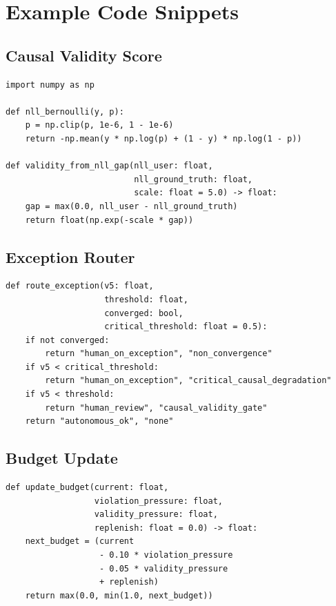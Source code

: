 \documentclass[11pt]{article}
\begin{document}
\section{Example Code Snippets}

\subsection{Causal Validity Score}

\begin{verbatim}
import numpy as np

def nll_bernoulli(y, p):
    p = np.clip(p, 1e-6, 1 - 1e-6)
    return -np.mean(y * np.log(p) + (1 - y) * np.log(1 - p))

def validity_from_nll_gap(nll_user: float,
                          nll_ground_truth: float,
                          scale: float = 5.0) -> float:
    gap = max(0.0, nll_user - nll_ground_truth)
    return float(np.exp(-scale * gap))
\end{verbatim}

\subsection{Exception Router}

\begin{verbatim}
def route_exception(v5: float,
                    threshold: float,
                    converged: bool,
                    critical_threshold: float = 0.5):
    if not converged:
        return "human_on_exception", "non_convergence"
    if v5 < critical_threshold:
        return "human_on_exception", "critical_causal_degradation"
    if v5 < threshold:
        return "human_review", "causal_validity_gate"
    return "autonomous_ok", "none"
\end{verbatim}

\subsection{Budget Update}

\begin{verbatim}
def update_budget(current: float,
                  violation_pressure: float,
                  validity_pressure: float,
                  replenish: float = 0.0) -> float:
    next_budget = (current
                   - 0.10 * violation_pressure
                   - 0.05 * validity_pressure
                   + replenish)
    return max(0.0, min(1.0, next_budget))
\end{verbatim}
\end{document}
